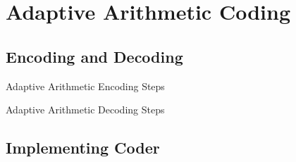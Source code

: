 \documentclass[a4paper, twocolumn]{article}
\begin{document}
    \section{Adaptive Arithmetic Coding} \label{sec:adaptive_arithmetic_coding}
        \subsection{Encoding and Decoding} \label{sec:aac_encoding_decoding}

        \begin{algorithm}
            \begin{algorithmic}
                \ENDWHILE
            \end{algorithmic}
            \caption{Adaptive Arithmetic Encoding Steps}
            \label{alg:aacz}
        \end{algorithm}

        \begin{algorithm}
            \begin{algorithmic}
                \ENDWHILE
            \end{algorithmic}
            \caption{Adaptive Arithmetic Decoding Steps}
            \label{alg:aacx}
        \end{algorithm}

        \subsection{Implementing Coder} \label{sec:aac_implementing_coder}
\end{document}
